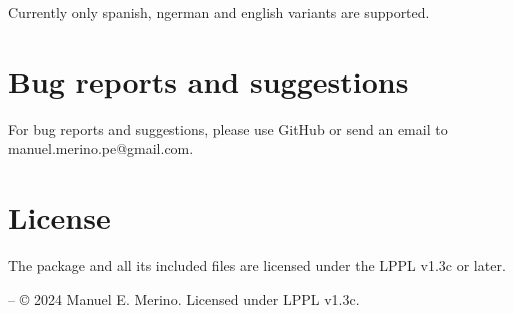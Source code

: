 \documentclass[a4paper,12pt]{article}
\begin{document}
	Currently only spanish, ngerman and english variants are supported.

	\section{Bug reports and suggestions}

	For bug reports and suggestions, please use GitHub or send an email to manuel.merino.pe@gmail.com.

	\section{License}

	The \tblrextras{} package and all its included files are licensed under the LPPL v1.3c or later.

	\vfill
	\centering
	\footnotesize \tblrextras{} -- {\copyright} 2024 Manuel E. Merino. Licensed under LPPL v1.3c.
\end{document}
